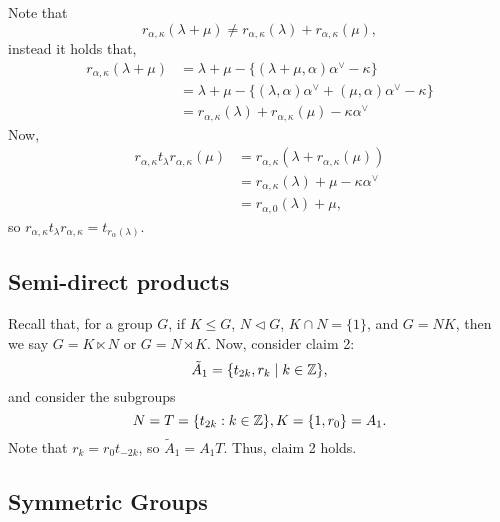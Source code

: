 Note that
\[
    r_{\alpha,\kappa}(\lambda + \mu) \neq r_{\alpha,\kappa}(\lambda)
    + r_{\alpha,\kappa}(\mu),
\]
instead it holds that,
\begin{align*}
    r_{\alpha, \kappa} (\lambda+\mu)
    &= \lambda + \mu - \{(\lambda + \mu, \alpha) \alpha^\vee - \kappa\} \\
    &= \lambda + \mu - \{(\lambda, \alpha) \alpha^\vee + (\mu, \alpha) \alpha^\vee - \kappa\} \\
    &= r_{\alpha,\kappa}(\lambda) + r_{\alpha, \kappa}(\mu) - \kappa \alpha^\vee
\end{align*}
Now,
\begin{align*}
    r_{\alpha,\kappa} t_{\lambda} r_{\alpha, \kappa}(\mu)
    &= r_{\alpha, \kappa}(\lambda + r_{\alpha, \kappa}(\mu)) \\
    &= r_{\alpha, \kappa}(\lambda) + \mu - \kappa \alpha^\vee \\
    &= r_{\alpha,0}(\lambda) + \mu,
\end{align*}
so $r_{\alpha, \kappa} t_\lambda r_{\alpha, \kappa} = t_{r_\alpha(\lambda)}$.

\subsection{Semi-direct products}

Recall that, for a group $G$, if $K \leq G$, $N \triangleleft G$,
$K \cap N = \{1\}$, and $G = NK$,
then we say $G = K \ltimes N$ or $G = N \rtimes K$.
Now, consider claim 2:
\[
    \tilde{A}_1 = \{t_{2k}, r_k \mid k \in \mathbb{Z}\},
\]
and consider the subgroups
\[
    N = T = \{t_{2k} : k \in \mathbb{Z}\}, K = \{1, r_0\} = A_1.
\]
Note that $r_k = r_0 t_{-2k}$, so $\tilde{A}_1 = A_1T$. Thus, claim 2 holds.

\subsection{Symmetric Groups}

